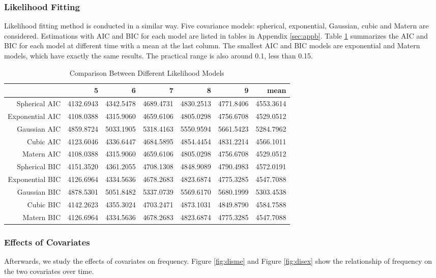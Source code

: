 \documentclass[hidelinks,12pt]{article}
\begin{document}
	\subsubsection{Likelihood Fitting}
	Likelihood fitting method is conducted in a similar way. Five covariance models: spherical, exponential, Gaussian, cubic and Matern are considered. Estimations with AIC and BIC for each model are listed in tables in Appendix \ref{sec:appb}. Table \ref{tbl:complik} summarizes the AIC and BIC for each model at different time with a mean at the last column. The smallest AIC and BIC models are exponential and Matern models, which have exactly the same results. The practical range is also around 0.1, less than 0.15.
	\begin{table}[ht]
		\centering
		\caption{Comparison Between Different Likelihood Models \label{tbl:complik}}
		\begin{tabular}{rrrrrrr}
			\hline
			& 5 & 6 & 7 & 8 & 9 & mean \\ 
			\hline
			Spherical AIC & 4132.6943 & 4342.5478 & 4689.4731 & 4830.2513 & 4771.8406 & 4553.3614 \\ 
			Exponential AIC & 4108.0388 & 4315.9060 & 4659.6106 & 4805.0298 & 4756.6708 & 4529.0512 \\ 
			Gaussian AIC & 4859.8724 & 5033.1905 & 5318.4163 & 5550.9594 & 5661.5423 & 5284.7962 \\ 
			Cubic AIC & 4123.6046 & 4336.6447 & 4684.5895 & 4854.4454 & 4831.2214 & 4566.1011 \\ 
			Matern AIC & 4108.0388 & 4315.9060 & 4659.6106 & 4805.0298 & 4756.6708 & 4529.0512 \\ 
			Spherical BIC & 4151.3520 & 4361.2055 & 4708.1308 & 4848.9089 & 4790.4983 & 4572.0191 \\ 
			Exponential BIC & 4126.6964 & 4334.5636 & 4678.2683 & 4823.6874 & 4775.3285 & 4547.7088 \\ 
			Gaussian BIC & 4878.5301 & 5051.8482 & 5337.0739 & 5569.6170 & 5680.1999 & 5303.4538 \\ 
			Cubic BIC & 4142.2623 & 4355.3024 & 4703.2471 & 4873.1031 & 4849.8790 & 4584.7588 \\ 
			Matern BIC & 4126.6964 & 4334.5636 & 4678.2683 & 4823.6874 & 4775.3285 & 4547.7088 \\ 
			\hline
		\end{tabular}
	\end{table}
	
	\subsubsection{Effects of Covariates}
	Afterwards, we study the effects of covariates on frequency. Figure \ref{fig:disme} and Figure \ref{fig:disex} show the relationship of frequency on the two covariates over time.\\
	
\end{document}
